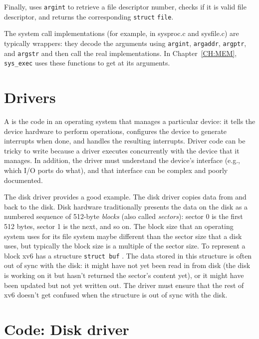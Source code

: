 Finally,
uses
\lstinline{argint}
to retrieve a file descriptor number, checks if it is valid
file descriptor, and returns the corresponding
\lstinline{struct}
\lstinline{file}.

The system call implementations (for example, in sysproc.c and sysfile.c)
are typically wrappers: they decode the arguments using 
\lstinline{argint},
\lstinline{argaddr},
\lstinline{argptr}, 
and 
\lstinline{argstr}
and then call the real implementations.
In Chapter~\ref{CH:MEM},
\lstinline{sys_exec}
uses these functions to get at its arguments.

\section{Drivers}

A
is the code in an operating system that manages a particular device:
it tells the device hardware to perform operations,
configures the device to generate interrupts when done,
and handles the resulting interrupts.
Driver code can be tricky to write
because a driver executes concurrently with the device that it manages.  In
addition, the driver must understand the device's interface (e.g., which I/O
ports do what), and that interface can be complex and poorly documented.

The disk driver provides a good example.  The disk driver copies data
from and back to the disk.  Disk hardware traditionally presents the data on the
disk as a numbered sequence of 512-byte 
\textit{blocks} 
(also called 
\textit{sectors}): 
sector 0 is the first 512 bytes, sector 1 is the next, and so on. The block size
that an operating system uses for its file system maybe different than the
sector size that a disk uses, but typically the block size is a multiple of the
sector size. To
represent a block xv6 has a structure
\lstinline{struct buf}
.
The
data stored in this structure is often out of sync with the disk: it might have
not yet been read in from disk (the disk is working on it but hasn't returned
the sector's content yet), or it might have been updated but not yet written
out.  The driver must ensure that the rest of xv6 doesn't get confused when the
structure is out of sync with the disk.

\section{Code: Disk driver}

